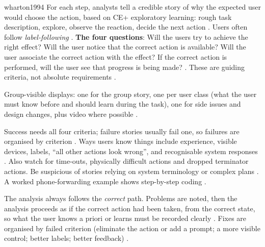 \begin{papercard}{wharton1994}
 For each step, analysts tell a credible story of why the expected user would choose the action, based on CE+ exploratory learning: rough task description, explore, observe the reaction, decide the next action . Users often follow \emph{label-following} . \textbf{The four questions}: Will the users try to achieve the right effect? Will the user notice that the correct action is available? Will the user associate the correct action with the effect? If the correct action is performed, will the user see that progress is being made? . These are guiding criteria, not absolute requirements .

 Group-visible displays: one for the group story, one per user class (what the user must know before and should learn during the task), one for side issues and design changes, plus video where possible .

 Success needs all four criteria; failure stories usually fail one, so failures are organised by criterion . Ways users know things include experience, visible devices, labels, ``all other actions look wrong'', and recognisable system responses . Also watch for time-outs, physically difficult actions and dropped terminator actions. Be suspicious of stories relying on system terminology or complex plans . A worked phone-forwarding example shows step-by-step coding .

 The analysis always follows the \emph{correct} path. Problems are noted, then the analysis proceeds as if the correct action had been taken, from the correct state, so what the user knows a priori or learns must be recorded clearly . Fixes are organised by failed criterion (eliminate the action or add a prompt; a more visible control; better labels; better feedback) .


\end{papercard}
